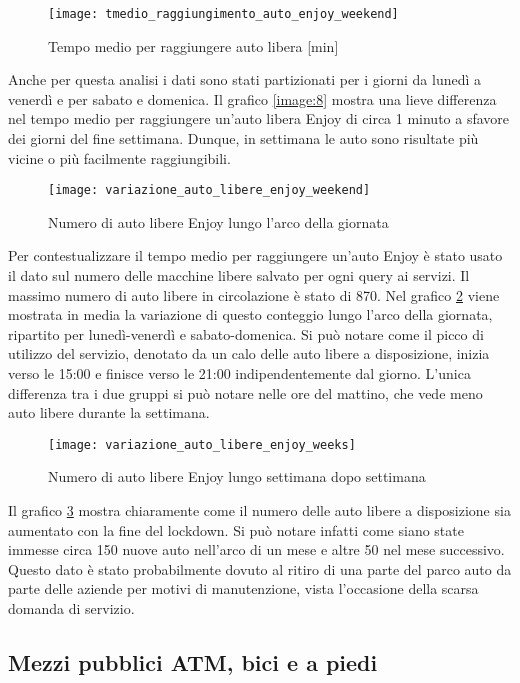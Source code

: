 \begin{figure}[H]
	\texttt{[image: tmedio\_raggiungimento\_auto\_enjoy\_weekend]}
	\caption{Tempo medio per raggiungere auto libera [min]}
	\label{image:21}
\end{figure}

Anche per questa analisi i dati sono stati partizionati per i giorni da lunedì a venerdì e per sabato e domenica. Il grafico \ref{image:8} mostra una lieve differenza nel tempo medio per raggiungere un'auto libera Enjoy di circa 1 minuto a sfavore dei giorni del fine settimana. Dunque, in settimana le auto sono risultate più vicine o più facilmente raggiungibili.

\begin{figure}[H]
\texttt{[image: variazione\_auto\_libere\_enjoy\_weekend]}
\caption{Numero di auto libere Enjoy lungo l'arco della giornata}
\label{image:9}
\end{figure}

Per contestualizzare il tempo medio per raggiungere un'auto Enjoy è stato usato il dato sul numero delle macchine libere salvato per ogni query ai servizi. Il massimo numero di auto libere in circolazione è stato di 870. Nel grafico \ref{image:9} viene mostrata in media la variazione di questo conteggio lungo l'arco della giornata, ripartito per lunedì-venerdì e sabato-domenica. Si può notare come il picco di utilizzo del servizio, denotato da un calo delle auto libere a disposizione, inizia verso le 15:00 e finisce verso le 21:00 indipendentemente dal giorno. L'unica differenza tra i due gruppi si può notare nelle ore del mattino, che vede meno auto libere durante la settimana.

\begin{figure}[H]
\texttt{[image: variazione\_auto\_libere\_enjoy\_weeks]}
\caption{Numero di auto libere Enjoy lungo settimana dopo settimana}
\label{image:10}
\end{figure}

Il grafico \ref{image:10} mostra chiaramente come il numero delle auto libere a disposizione sia aumentato con la fine del lockdown. Si può notare infatti come siano state immesse circa 150 nuove auto nell'arco di un mese e altre 50 nel mese successivo. Questo dato è stato probabilmente dovuto al ritiro di una parte del parco auto da parte delle aziende per motivi di manutenzione, vista l'occasione della scarsa domanda di servizio.

\subsection{Mezzi pubblici ATM, bici e a piedi}

